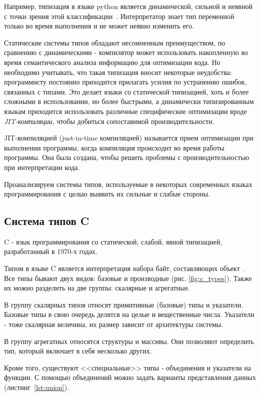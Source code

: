 Например, типизация в языке python является динамической, сильной и неявной с точки зрения этой классификации~\cite{PythonWiki}.
Интерпретатор знает тип переменной только во время выполнения и не может неявно изменить его.

Статические системы типов обладают несомненным преимуществом, по сравнению с динамическими - компилятор может использовать накопленную во время семантического анализа информацию для оптимизации кода.
Но необходимо учитывать, что такая типизация вносит некоторые неудобства: программисту постоянно приходится прилагать усилия по устранению ошибок, связанных с типами.
Это делает языки со статической типизацией, хоть и более сложными в использовании, но более быстрыми, а динамически типизированным языкам приходится использовать различные специфические оптимизации вроде \textit{JIT-компиляции}, чтобы добиться сопоставимой производительности.

JIT-компиляцией (just-in-time компиляцией) называется прием оптимизации при выполнении программы, когда компиляция происходит во время работы программы.
Она была создана, чтобы решить проблемы с производительностью при интерпретации кода.

Проанализируем системы типов, используемые в некоторых современных языках программирования с целью выявить их сильные и слабые стороны.

\subsection{Система типов C}
\label{subsec:c_type_system}

C - язык программирования со статической, слабой, явной типизацией, разработанный в 1970-х годах.

Типом в языке C является интерпретация набора байт, составляющих объект~\cite{CSpec}.
Все типы бывают двух видов: базовые и производные (рис. \ref{fig:c_types}).
Также их можно разделить на две группы: скалярные и агрегатные.

В группу скалярных типов относят примитивные (базовые) типы и указатели.
Базовые типы в свою очередь делятся на целые и вещественные числа.
Указатели - тоже скалярная величина, их размер зависит от архитектуры системы.

В группу агрегатных относятся структуры и массивы.
Они позволяют определить тип, который включает в себя несколько других.

Кроме того, существуют <<специальные>> типы - объединения и указатели на функции.
С помощью объединений можно задать варианты представления данных (листинг~\ref{lst:union}).

